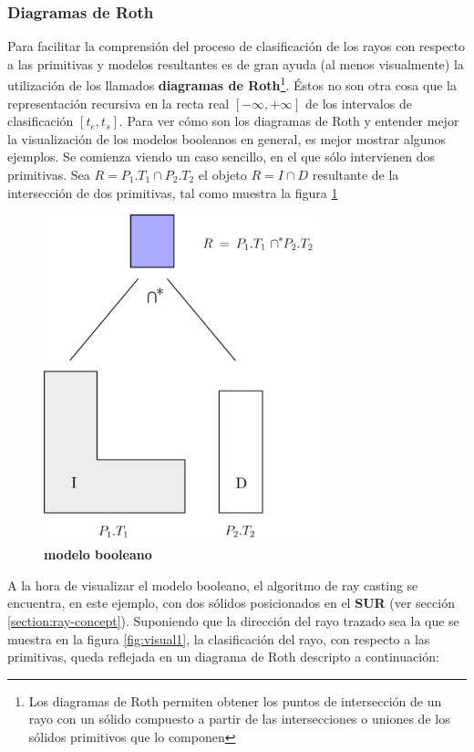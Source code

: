 \subsubsection{Diagramas de Roth}
Para facilitar la comprensión del proceso de clasificación de los rayos con respecto a las primitivas y modelos resultantes es de gran ayuda (al menos visualmente) la utilización de los llamados \textbf{diagramas de Roth}\footnote{Los diagramas de Roth permiten obtener los puntos de intersección de un rayo con un sólido compuesto a partir de las intersecciones o uniones de los sólidos primitivos que lo componen}. Éstos no son otra cosa que la representación recursiva en la recta real $[−\infty, +\infty]$ de los intervalos de clasificación $[t_e, t_s]$.
Para ver cómo son los diagramas de Roth y entender mejor la visualización de los modelos booleanos en general, es mejor mostrar algunos ejemplos. Se comienza viendo un caso sencillo, en el que sólo intervienen dos primitivas.
Sea $R = P_1.T_1 \cap P_2.T_2$ el objeto $R = I \cap D$ resultante de la intersección de dos primitivas, tal como muestra la figura \ref{fig:visual0}

\begin{figure}[h]
\includegraphics[width=8cm]{Img/GEO/ray0.png}
\centering
\caption{\textbf{\footnotesize{modelo booleano}}}
\label{fig:visual0}
\end{figure}

A la hora de visualizar el modelo booleano, el algoritmo de ray casting se encuentra, en este ejemplo, con dos sólidos posicionados en el \textbf{SUR} (ver sección \ref{section:ray-concept}). Suponiendo que la dirección del rayo trazado sea la que se muestra en la figura \ref{fig:visual1}, la clasificación del rayo, con respecto a las primitivas, queda reflejada en un diagrama de Roth descripto a continuación:

